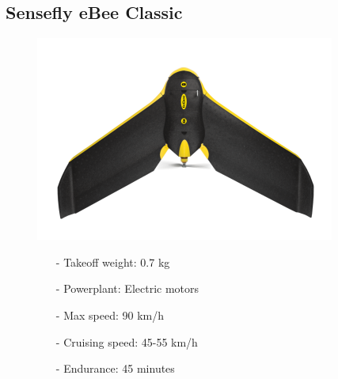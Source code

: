 \documentclass{article}
\begin{document}
\subsection{Sensefly eBee Classic}
\begin{figure}[h]
    \begin{minipage}[b]{.45\linewidth}
        \centering
        \includegraphics[width=0.7\linewidth]{Aircraft pics/Sensefly ebee classic.png}
    \end{minipage}\hfill
    \begin{minipage}[b]{0.45\linewidth}
        \begin{itemize}
            \item [-] Takeoff weight: 0.7 kg
            \item [-] Powerplant: Electric motors
            \item [-] Max speed: 90 km/h 
            \item [-] Cruising speed: 45-55 km/h 
            \item [-] Endurance: 45 minutes
        \end{itemize}
    \end{minipage}
\end{figure}

\vspace{\fill}
\clearpage
\end{document}
